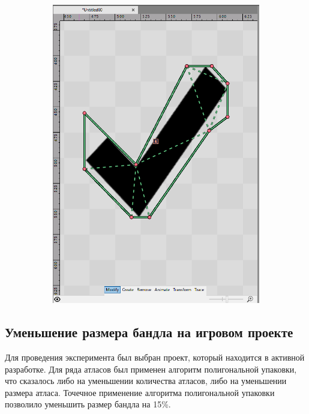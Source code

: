 \documentclass{fefu_thesis/cls/fefu}
\begin{document}
\begin{figure}[H]
\begin{subfigure}{.32\linewidth}
            \includegraphics[scale=0.25]{images/CheckDone.png}
        \end{subfigure}
    \end{figure}

    \subsection{Уменьшение размера бандла на игровом проекте}

    Для проведения эксперимента был выбран проект, который находится в активной разработке. Для ряда атласов был применен алгоритм полигональной упаковки, что сказалось либо на уменьшении количества атласов, либо на уменьшении размера атласа. Точечное применение алгоритма полигональной упаковки позволило уменьшить размер бандла на 15\%.
\end{document}
